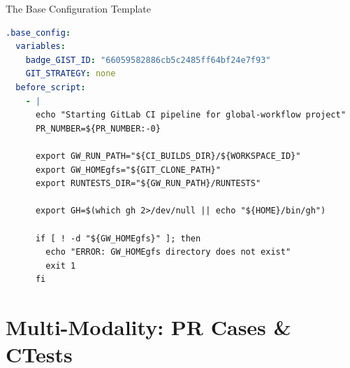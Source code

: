 \documentclass[aspectratio=169]{beamer}
\begin{document}
\begin{frame}[fragile]{The Base Configuration Template}

\begin{lstlisting}[language=yaml,basicstyle=\ttfamily\tiny,title={\small .base\_config -- Shared by ALL Jobs}]
.base_config:
  variables:
    badge_GIST_ID: "66059582886cb5c2485ff64bf24e7f93"
    GIT_STRATEGY: none
  before_script:
    - |
      echo "Starting GitLab CI pipeline for global-workflow project"
      PR_NUMBER=${PR_NUMBER:-0}
      
      export GW_RUN_PATH="${CI_BUILDS_DIR}/${WORKSPACE_ID}"
      export GW_HOMEgfs="${GIT_CLONE_PATH}"
      export RUNTESTS_DIR="${GW_RUN_PATH}/RUNTESTS"
      
      export GH=$(which gh 2>/dev/null || echo "${HOME}/bin/gh")
      
      if [ ! -d "${GW_HOMEgfs}" ]; then
        echo "ERROR: GW_HOMEgfs directory does not exist"
        exit 1
      fi
\end{lstlisting}

\vspace{0.2cm}
\begin{center}
\end{center}

\end{frame}

\section{Multi-Modality: PR Cases \& CTests}
\end{document}
